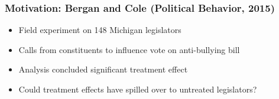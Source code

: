 \documentclass{beamer}
\begin{document}




\begin{frame}
\frametitle{Motivation: Bergan and Cole (Political Behavior, 2015)}
\begin{itemize}
\item {\LARGE Field experiment on 148 Michigan legislators}
\vspace{5mm}
\item {\LARGE Calls from constituents to influence vote on anti-bullying bill}
\vspace{5mm}
\item {\LARGE Analysis concluded significant treatment effect}
\vspace{5mm}
\item {\LARGE Could treatment effects have spilled over to untreated legislators?}
\end{itemize}
\end{frame}
\end{document}
